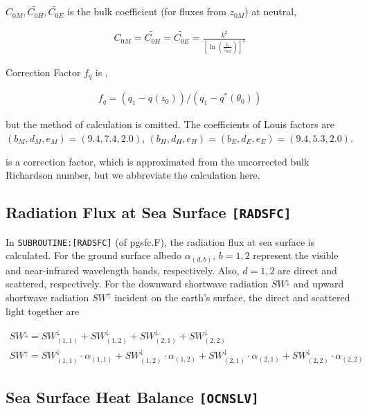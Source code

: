 \begin{itemize}
\(C_{0M}, \widetilde{C_{0H}}, \widetilde{C_{0E}}\) is the bulk
coefficient (for fluxes from \(z_{0M}\)) at neutral,

\begin{eqnarray}
    C_{0M}  =  \widetilde{C_{0H}}  =  \widetilde{C_{0E}}  =
       \frac{k^2}{\left[\ln \left(\frac{z_1}{z_{0M}}\right)\right]^2 }
\end{eqnarray}

Correction Factor \(f_q\) is ,

\begin{eqnarray}
  f_q = (q_1 - q(z_0))/(q_1 - q^{\ast}(\theta_0))
\end{eqnarray}

but the method of calculation is omitted. The coefficients of Louis
factors are \(( b_M, d_M, e_M ) = ( 9.4, 7.4, 2.0 )\),
\(( b_H, d_H, e_H ) = ( b_E, d_E, e_E ) = ( 9.4, 5.3, 2.0 )\).

is a correction factor, which is approximated from the uncorrected bulk
Richardson number, but we abbreviate the calculation here.

\hypertarget{radiation-flux-at-sea-surface-radsfc}{%
\subsection{\texorpdfstring{Radiation Flux at Sea Surface
\texttt{{[}RADSFC{]}}}{Radiation Flux at Sea Surface {[}RADSFC{]}}}\label{radiation-flux-at-sea-surface-radsfc}}

In \texttt{SUBROUTINE:{[}RADSFC{]}} (of pgsfc.F), the radiation flux at
sea surface is calculated. For the ground surface albedo
\(\alpha_{(d,b)}\), \(b=1,2\) represent the visible and near-infrared
wavelength bands, respectively. Also, \(d=1,2\) are direct and
scattered, respectively. For the downward shortwave radiation
\(SW^\downarrow\) and upward shortwave radiation \(SW^\uparrow\)
incident on the earth's surface, the direct and scattered light together
are

\begin{eqnarray}
    SW^\downarrow = SW^\downarrow_{(1,1)}+SW^\downarrow_{(1,2)}+SW^\downarrow_{(2,1)}+SW^\downarrow_{(2,2)} \\
SW^\uparrow = SW^\downarrow_{(1,1)}\cdot\alpha_{(1,1)}+SW^\downarrow_{(1,2)}\cdot\alpha_{(1,2)}+SW^\downarrow_{(2,1)}\cdot\alpha_{(2,1)}+SW^\downarrow_{(2,2)}\cdot\alpha_{(2,2)}
\end{eqnarray}

\hypertarget{sea-surface-heat-balance-ocnslv}{%
\subsection{\texorpdfstring{Sea Surface Heat Balance
\texttt{{[}OCNSLV{]}}}{Sea Surface Heat Balance {[}OCNSLV{]}}}\label{sea-surface-heat-balance-ocnslv}}


\end{itemize}
